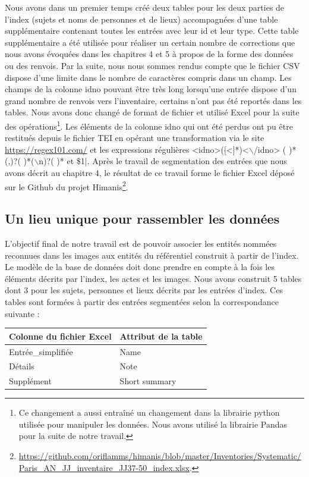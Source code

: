 \documentclass[a4paper,12pt,twoside]{book}
\begin{document}
	Nous avons dans un premier temps créé deux tables pour les deux parties de l'index (sujets et noms de personnes et de lieux) accompagnées d'une table supplémentaire contenant toutes les entrées avec leur id et leur type. Cette table supplémentaire a été utilisée pour réaliser un certain nombre de corrections que nous avons évoquées dans les chapitres 4 et 5 à propos de la forme des données ou des renvois. Par la suite, nous nous sommes rendus compte que le fichier CSV dispose d'une limite dans le nombre de caractères compris dans un champ. Les champs de la colonne \og idno\fg{} pouvant être très long lorsqu'une entrée dispose d'un grand nombre de renvois vers l'inventaire, certains n'ont pas été reportés dans les tables. Nous avons donc changé de format de fichier et utilisé Excel pour la suite des opérations\footnote{Ce changement a aussi entraîné un changement dans la librairie python utilisée pour manipuler les données. Nous avons utilisé la librairie Pandas pour la suite de notre travail.}. Les éléments de la colonne \og idno\fg{} qui ont été perdus ont pu être restitués depuis le fichier TEI en opérant une transformation via le site \url{https://regex101.com/} et les expressions régulières \og <idno>([$\hat{}$<]*)<$\backslash$/idno> ( )*(,)?( )*($\backslash$n)?( )* \fg{} et \og \$1|\fg{}. Après le travail de segmentation des entrées que nous avons décrit au chapitre 4, le résultat de ce travail forme le fichier Excel déposé sur le Github du projet Himanis\footnote{\url{https://github.com/oriflamms/himanis/blob/master/Inventories/Systematic/Paris_AN_JJ_inventaire_JJ37-50_index.xlsx}.}.
	
	\subsection{Un lieu unique pour rassembler les données}
	
	L'objectif final de notre travail est de pouvoir associer les entités nommées reconnues dans les images aux entités du référentiel construit à partir de l'index. Le modèle de la base de données doit donc prendre en compte à la fois les éléments décrits par l'index, les actes et les images. Nous avons construit 5 tables dont 3 pour les sujets, personnes et lieux décrits par les entrées d'index. Ces tables sont formées à partir des entrées segmentées selon la correspondance suivante :
	
	\begin{center}
		\begin{tabular}{|p{5cm}|p{5cm}|}
			\hline
			Colonne du fichier Excel & Attribut de la table \\ \hline \hline
			Entrée\_simplifiée & Name \\ \hline
			Détails & Note \\ \hline
			Supplément & Short summary \\ \hline
		\end{tabular}
	\end{center}
	
\end{document}
